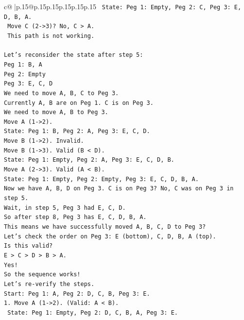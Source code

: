 \documentclass{article}
\begin{document}
{\begin{supertabular}{c@{$\;$}|p{.15\linewidth}@{}p{.15\linewidth}p{.15\linewidth}p{.15\linewidth}p{.15\linewidth}p{.15\linewidth}}
{{{\texttt{   State: Peg 1: Empty, Peg 2: C, Peg 3: E, D, B, A.} \\
\texttt{   Move C (2{-}>3)? No, C > A.} \\
\texttt{   This path is not working.} \\
\\ 
\texttt{Let's reconsider the state after step 5:} \\
\texttt{Peg 1: B, A} \\
\texttt{Peg 2: Empty} \\
\texttt{Peg 3: E, C, D} \\
\texttt{We need to move A, B, C to Peg 3.} \\
\texttt{Currently A, B are on Peg 1. C is on Peg 3.} \\
\texttt{We need to move A, B to Peg 3.} \\
\texttt{Move A (1{-}>2).} \\
\texttt{State: Peg 1: B, Peg 2: A, Peg 3: E, C, D.} \\
\texttt{Move B (1{-}>2). Invalid.} \\
\texttt{Move B (1{-}>3). Valid (B < D).} \\
\texttt{State: Peg 1: Empty, Peg 2: A, Peg 3: E, C, D, B.} \\
\texttt{Move A (2{-}>3). Valid (A < B).} \\
\texttt{State: Peg 1: Empty, Peg 2: Empty, Peg 3: E, C, D, B, A.} \\
\texttt{Now we have A, B, D on Peg 3. C is on Peg 3? No, C was on Peg 3 in step 5.} \\
\texttt{Wait, in step 5, Peg 3 had E, C, D.} \\
\texttt{So after step 8, Peg 3 has E, C, D, B, A.} \\
\texttt{This means we have successfully moved A, B, C, D to Peg 3?} \\
\texttt{Let's check the order on Peg 3: E (bottom), C, D, B, A (top).} \\
\texttt{Is this valid?} \\
\texttt{E > C > D > B > A.} \\
\texttt{Yes!} \\
\texttt{So the sequence works!} \\
\texttt{Let's re{-}verify the steps.} \\
\texttt{Start: Peg 1: A, Peg 2: D, C, B, Peg 3: E.} \\
\texttt{1. Move A (1{-}>2). (Valid: A < B).} \\
\texttt{   State: Peg 1: Empty, Peg 2: D, C, B, A, Peg 3: E.} \\
}}}
\end{supertabular}}
\end{document}
